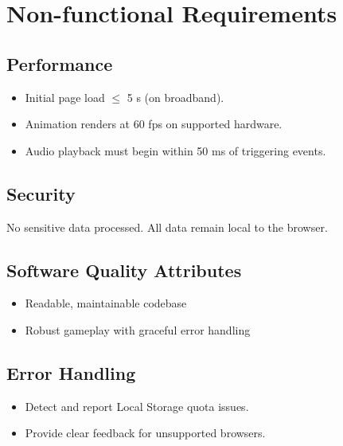 \documentclass[11pt]{scrreprt}
\begin{document}
\chapter{Non-functional Requirements}

\section{Performance}
\begin{itemize}
  \item Initial page load $\leq$ 5 s (on broadband).
  \item Animation renders at 60 fps on supported hardware.
  \item Audio playback must begin within 50 ms of triggering events.
\end{itemize}

\section{Security}
No sensitive data processed. All data remain local to the browser.

\section{Software Quality Attributes}
\begin{itemize}
  \item Readable, maintainable codebase
  \item Robust gameplay with graceful error handling
\end{itemize}

\section{Error Handling}
\begin{itemize}
  \item Detect and report Local Storage quota issues.
  \item Provide clear feedback for unsupported browsers.
\end{itemize}

\appendix
\end{document}
